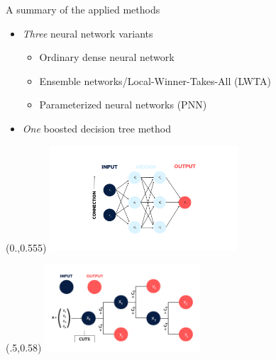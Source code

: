 \documentclass[UKenglish]{beamer}
\begin{document}
\begin{frame}{A summary of the applied methods}
    \begin{itemize}

    \item \emph{Three} neural network variants
    \begin{itemize}
        \item Ordinary dense neural network
        \item Ensemble networks/Local-Winner-Takes-All (LWTA)
        \item Parameterized neural networks (PNN)
    \end{itemize}

    \item \emph{One} boosted decision tree method

    \end{itemize}

    \begin{textblock}{1}(0.,0.555)
        \includegraphics[width=0.525\textwidth]{figures/Input_labels.png}
    \end{textblock}
    \begin{textblock}{1}(.5,0.58)
        \includegraphics[width=0.435\textwidth]{figures/DT.png}
    \end{textblock}
\end{frame}
\end{document}
